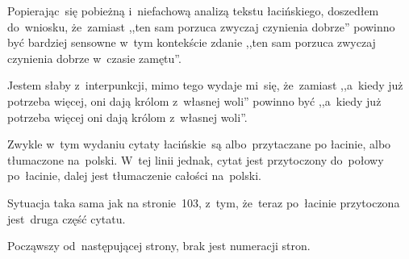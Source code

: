 \documentclass[a4paper,11pt]{article}
\begin{document}
\start {} Popierając~się pobieżną i~niefachową analizą
tekstu łacińskiego, doszedłem do~wniosku, że~zamiast ,,ten sam porzuca
zwyczaj czynienia dobrze'' powinno być bardziej sensowne w~tym
kontekście zdanie ,,ten sam porzuca zwyczaj czynienia dobrze w~czasie
zamętu''.

\vspace{\spaceFour}


\start {} Jestem słaby z~interpunkcji, mimo tego wydaje
mi~się, że~zamiast ,,a~kiedy już potrzeba więcej, oni dają królom
z~własnej woli'' powinno być ,,a~kiedy już potrzeba więcej oni dają
królom z~własnej woli''.

\vspace{\spaceFour}


\start {} Zwykle w~tym wydaniu cytaty łacińskie~są
albo~przytaczane po łacinie, albo tłumaczone na~polski. W~tej linii
jednak, cytat jest przytoczony do~połowy po~łacinie, dalej jest
tłumaczenie całości na~polski.

\vspace{\spaceFour}


\start {} Sytuacja taka sama jak na stronie~103, z~tym,
że~teraz po~łacinie przytoczona jest~druga część cytatu.

\vspace{\spaceFour}


\start {} Począwszy od~następującej strony, brak jest numeracji
stron.

\vspace{\spaceFour}


\start {}
\end{document}

